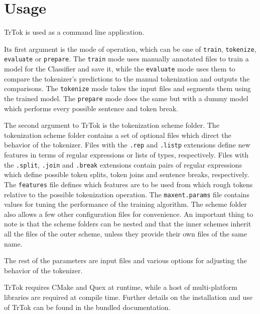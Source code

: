 \section{Usage}
\label{sec:usage}

TrTok is used as a command line application.

Its first argument is the mode of operation, which can be one of
\texttt{train}, \texttt{tokenize}, \texttt{evaluate} or
\texttt{prepare}. The \texttt{train} mode uses manually annotated
files to train a model for the Classifier and save it, while the
\texttt{evaluate} mode uses them to compare the tokenizer's
predictions to the manual tokenization and outputs the comparisons.
The \texttt{tokenize} mode takes the input files and segments them
using the trained model. The \texttt{prepare} mode does the same but
with a dummy model which performs every possible sentence and token
break.

The second argument to TrTok is the tokenization scheme folder. The
tokenization scheme folder contains a set of optional files which
direct the behavior of the tokenizer. Files with the \texttt{.rep} and
\texttt{.listp} extensions define new features in terms of regular
expressions or lists of types, respectively. Files with the
\texttt{.split}, \texttt{.join} and \texttt{.break} extensions contain
pairs of regular expressions which define possible token splits, token
joins and sentence breaks, respectively. The \texttt{features} file
defines which features are to be used from which rough tokens relative
to the possible tokenization operation. The \texttt{maxent.params}
file contains values for tuning the performance of the training
algorithm. The scheme folder also allows a few other configuration
files for convenience. An important thing to note is that the scheme
folders can be nested and that the inner schemes inherit all the files
of the outer scheme, unless they provide their own files of the same
name.

The rest of the parameters are input files and various options for
adjusting the behavior of the tokenizer.

TrTok requires CMake and Quex at runtime, while a host of
multi-platform libraries are required at compile time. Further details
on the installation and use of TrTok can be found in the bundled
documentation.
